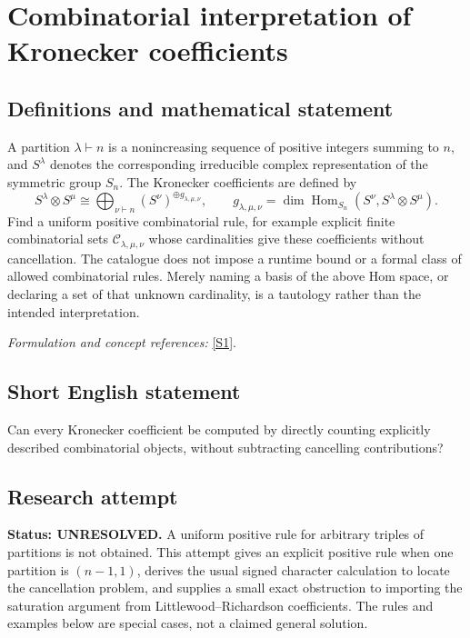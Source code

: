 \documentclass[11pt]{article}
\begin{document}
\section*{\texorpdfstring{Combinatorial interpretation of Kronecker coefficients}{Combinatorial interpretation of Kronecker coefficients}}\label{statement}
\subsection{Definitions and mathematical statement}
A partition $\lambda\vdash n$ is a nonincreasing sequence of positive integers summing to $n$, and $S^\lambda$ denotes the corresponding irreducible complex representation of the symmetric group $S_n$. The Kronecker coefficients are defined by
\[
 S^\lambda\otimes S^\mu\cong
 \bigoplus_{\nu\vdash n}(S^\nu)^{\oplus g_{\lambda,\mu,\nu}},
 \qquad
 g_{\lambda,\mu,\nu}=\dim\operatorname{Hom}_{S_n}
 (S^\nu,S^\lambda\otimes S^\mu).
\]
Find a uniform positive combinatorial rule, for example explicit finite combinatorial sets $\mathcal C_{\lambda,\mu,\nu}$ whose cardinalities give these coefficients without cancellation. The catalogue does not impose a runtime bound or a formal class of allowed combinatorial rules. Merely naming a basis of the above Hom space, or declaring a set of that unknown cardinality, is a tautology rather than the intended interpretation.
\par\smallskip\textit{Formulation and concept references:} \href{https://arxiv.org/abs/2604.23286}{[S1]}.

\subsection{Short English statement}
Can every Kronecker coefficient be computed by directly counting explicitly described combinatorial objects, without subtracting cancelling contributions?
\subsection{Research attempt}
\textbf{Status: UNRESOLVED.} A uniform positive rule for arbitrary triples of partitions is not obtained. This attempt gives an explicit positive rule when one partition is $(n-1,1)$, derives the usual signed character calculation to locate the cancellation problem, and supplies a small exact obstruction to importing the saturation argument from Littlewood--Richardson coefficients. The rules and examples below are special cases, not a claimed general solution.
\end{document}
